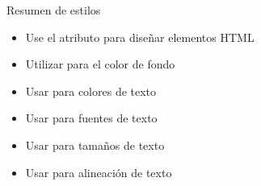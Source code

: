 \begin{frame}[c]{Resumen de estilos}
  \begin{itemize}
    \item Use el atributo  para diseñar elementos HTML
    \item Utilizar  para el color de fondo
    \item Usar  para colores de texto
    \item Usar  para fuentes de texto
    \item Usar  para tamaños de texto
    \item Usar  para alineación de texto
  \end{itemize}
\end{frame}
